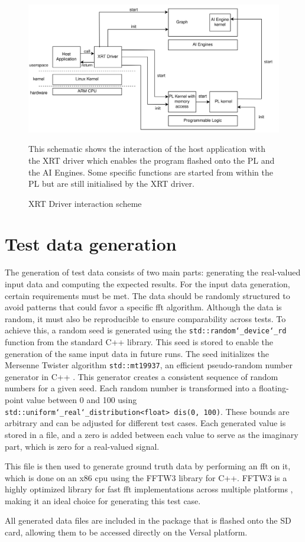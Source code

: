 \begin{figure}[h]
    \centering
    \includegraphics[width=1.0\textwidth]{images/host_interaction.png}
    \captionsetup{justification=centering}
    \caption{XRT Driver interaction scheme}
        This schematic shows the interaction of the host application with the XRT driver which enables the program flashed onto the PL and the AI Engines. Some specific functions are started from within the PL but are still initialised by the XRT driver.
    \label{fig:host_interact}
\end{figure}

\section{Test data generation}
The generation of test data consists of two main parts: generating the real-valued input data and computing the expected results. For the input data generation, certain requirements must be met. The data should be randomly structured to avoid patterns that could favor a specific \ac{fft} algorithm. Although the data is random, it must also be reproducible to ensure comparability across tests. To achieve this, a random seed is generated using the \texttt{std::random\char`_device\char`_rd} function from the standard C++ library. This seed is stored to enable the generation of the same input data in future runs. The seed initializes the Mersenne Twister algorithm \texttt{std::mt19937}, an efficient pseudo-random number generator in C++ \cite{matsumoto_mersenne_1998}. This generator creates a consistent sequence of random numbers for a given seed. Each random number is transformed into a floating-point value between 0 and 100 using \texttt{std::uniform\char`_real\char`_distribution<float> dis(0, 100)}. These bounds are arbitrary and can be adjusted for different test cases. Each generated value is stored in a file, and a zero is added between each value to serve as the imaginary part, which is zero for a real-valued signal.\par
This file is then used to generate ground truth data by performing an \ac{fft} on it, which is done on an x86 \ac{cpu} using the FFTW3 library for C++. FFTW3 is a highly optimized library for fast \ac{fft} implementations across multiple platforms \cite{frigo_design_2005}, making it an ideal choice for generating this test case.\par
All generated data files are included in the package that is flashed onto the SD card, allowing them to be accessed directly on the Versal platform. 
